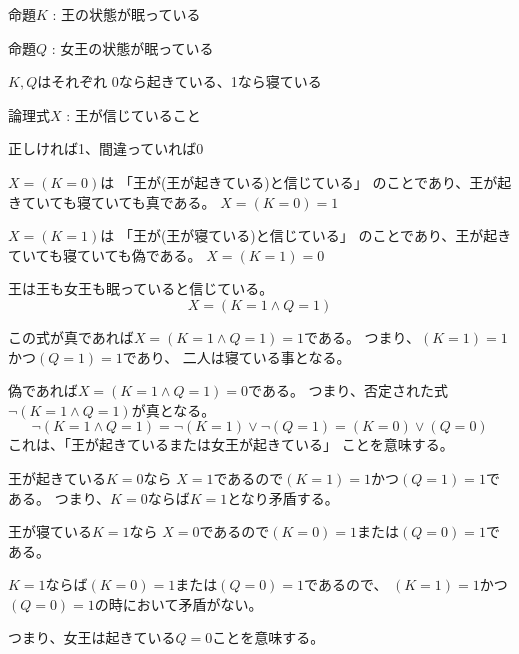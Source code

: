 \documentclass[12pt,b5paper]{ltjsarticle}
\begin{document}
\hrulefill

命題$K$ : 王の状態が眠っている

命題$Q$ : 女王の状態が眠っている

$K,Q$はそれぞれ 0なら起きている、1なら寝ている


論理式$X$ : 王が信じていること

正しければ1、間違っていれば0


\dotfill

$X=(K=0)$は
「王が(王が起きている)と信じている」
のことであり、王が起きていても寝ていても真である。
$X=(K=0)=1$

$X=(K=1)$は
「王が(王が寝ている)と信じている」
のことであり、王が起きていても寝ていても偽である。
$X=(K=1)=0$


\dotfill

王は王も女王も眠っていると信じている。
\begin{equation}
 X=(K=1 \land Q=1)
\end{equation}

この式が真であれば$X=(K=1 \land Q=1)=1$である。
つまり、$(K=1)=1$かつ$(Q=1)=1$であり、
二人は寝ている事となる。


偽であれば$X=(K=1 \land Q=1)=0$である。
つまり、否定された式$\lnot(K=1 \land Q=1)$が真となる。
\begin{equation}
 \lnot(K=1 \land Q=1)
  = \lnot(K=1) \lor \lnot(Q=1)
  = (K=0) \lor (Q=0)
\end{equation}
これは、「王が起きているまたは女王が起きている」
ことを意味する。


王が起きている$K=0$なら
$X=1$であるので$(K=1)=1$かつ$(Q=1)=1$である。
つまり、$K=0$ならば$K=1$となり矛盾する。


王が寝ている$K=1$なら
$X=0$であるので$(K=0)=1$または$(Q=0)=1$である。

$K=1$ならば$(K=0)=1$または$(Q=0)=1$であるので、
$(K=1)=1$かつ$(Q=0)=1$の時において矛盾がない。

つまり、女王は起きている$Q=0$ことを意味する。

\hrulefill
\end{document}
